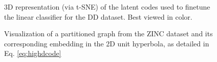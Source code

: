 \documentclass{article} \usepackage{iclr2024_conference,times}
\begin{document}
\begin{figure}
    \centering
    \caption{3D representation (via t-SNE) of the latent codes used to finetune the linear classifier for the DD dataset. Best viewed in color.} 
    \label{fig:latentspace}
\end{figure}

\begin{figure}
    \centering
    \caption{Visualization of a partitioned graph from the ZINC dataset and its corresponding embedding in the 2D unit hyperbola, as detailed in Eq. \ref{eq:highdcode}} 
    \label{fig:hyperspace}
\end{figure}
\end{document}
